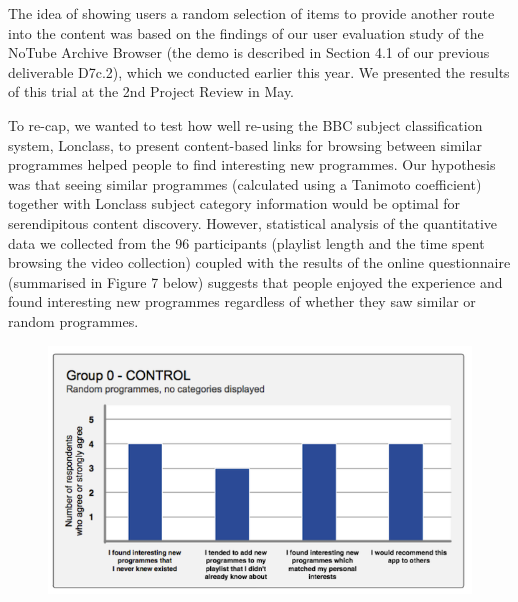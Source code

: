 \documentclass{notube}
\begin{document}
The idea of showing users a random selection of items to provide another route into the content was based on the findings of our user evaluation study of the NoTube Archive Browser (the demo is described in Section 4.1 of our previous deliverable D7c.2), which we conducted earlier this year. We presented the results of this trial at the 2nd Project Review in May. 

To re-cap, we wanted to test how well re-using the BBC subject classification system, Lonclass, to present content-based links for browsing between similar programmes helped people to find interesting new programmes. Our hypothesis was that seeing similar programmes (calculated using a Tanimoto coefficient) together with Lonclass subject category information would be optimal for serendipitous content discovery. However, statistical analysis of the quantitative data we collected from the 96 participants (playlist length and the time spent browsing the video collection) coupled with the results of the online questionnaire (summarised in Figure 7 below) suggests that people enjoyed the experience and found interesting new programmes regardless of whether they saw similar or random programmes. 

\begin{figure}[htbp]
\begin{center}
\includegraphics[width=6in]{images/group0.png}
\label{fig:group0}
\end{center}
\end{figure}
\end{document}
